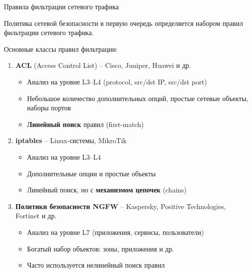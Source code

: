 \documentclass[10pt]{beamer}
\begin{document}
\begin{frame}{Правила фильтрации сетевого трафика}
    \begin{block}{}
        Политика сетевой безопасности в первую очередь определяется набором
        \alert{правил фильтрации} сетевого трафика.
    \end{block}

    \begin{block}{Основные классы правил фильтрации:}
        \begin{enumerate}
            \item \textbf{ACL} (Access Control List) -- Cisco, Juniper, Huawei и др.
            \begin{itemize}
                \item Анализ на уровне \alert{L3--L4} (protocol, src/dst IP, src/dst port)
                \item Небольшое количество дополнительных опций, простые сетевые объекты, наборы портов
                \item \textbf{Линейный поиск} правил (first-match)
            \end{itemize}
            \item \textbf{iptables} -- Linux-системы, MikroTik
            \begin{itemize}
                \item Анализ на уровне \alert{L3--L4}
                \item Дополнительные опции и простые объекты
                \item Линейный поиск, но с \textbf{механизмом цепочек} (chains)
            \end{itemize}
            \item \textbf{Политики безопасности NGFW} -- Kaspersky, Positive Technologies, Fortinet и др.
            \begin{itemize}
                \item Анализ на уровне \alert{L7} (приложения, сервисы, пользователи)
                \item Богатый набор объектов: зоны, приложения и др.
                \item Часто используется нелинейный поиск правил
            \end{itemize}
        \end{enumerate}
    \end{block}
\end{frame}
\end{document}
